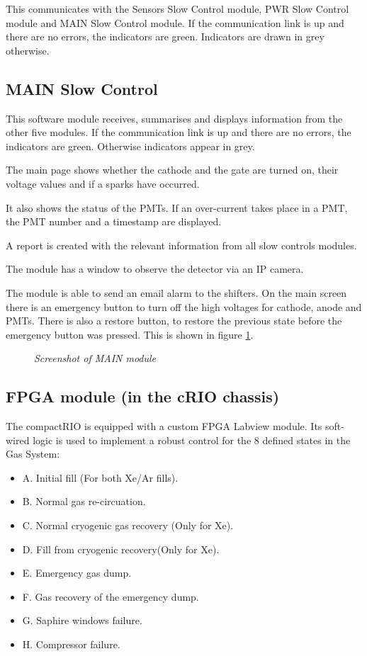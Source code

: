 This communicates with the Sensors Slow Control module, PWR Slow Control module and MAIN Slow Control module. If the communication link is up and there are no errors, the indicators are green. Indicators are drawn in grey otherwise.


\subsection{MAIN Slow Control}


This software module receives, summarises and displays information from the other five modules. If the communication link is up and there are no errors, the indicators are green. Otherwise indicators appear in grey.

The main page shows whether the cathode and the gate are turned on, their voltage values and if a sparks have occurred.

It also shows the status of the PMTs. If an over-current takes place in a PMT, the PMT number and a timestamp are displayed.

A report is created with the relevant information from all slow controls modules. 

The module has a window to observe the detector via an IP camera.

The module is able to send an email alarm to the shifters. On the main screen there is an emergency button to turn off the high voltages for cathode, anode and PMTs. There is also a restore button, to restore the previous state before the emergency button was pressed. This is shown in  figure \ref{fig:MAIN:MAIN}.

\begin{figure}[ht!]
    \bigskip
    \begin{center}\leavevmode
        \caption{\textit{Screenshot of MAIN module}}
        \label{fig:MAIN:MAIN}
    \end{center}
\end{figure}

\subsection{FPGA module (in the cRIO chassis)}

The compactRIO is equipped with a custom FPGA Labview module. Its soft-wired logic is used to implement a robust control for the 8 defined states in the Gas System:

\begin{itemize}
\item A. Initial fill (For both Xe/Ar fills).
\item B. Normal gas re-circuation.
\item C. Normal cryogenic gas recovery (Only for Xe).
\item D. Fill from cryogenic recovery(Only for Xe).
\item E. Emergency gas dump.
\item F. Gas recovery of the emergency dump.
\item G. Saphire windows failure.
\item H. Compressor failure.
\end{itemize}


